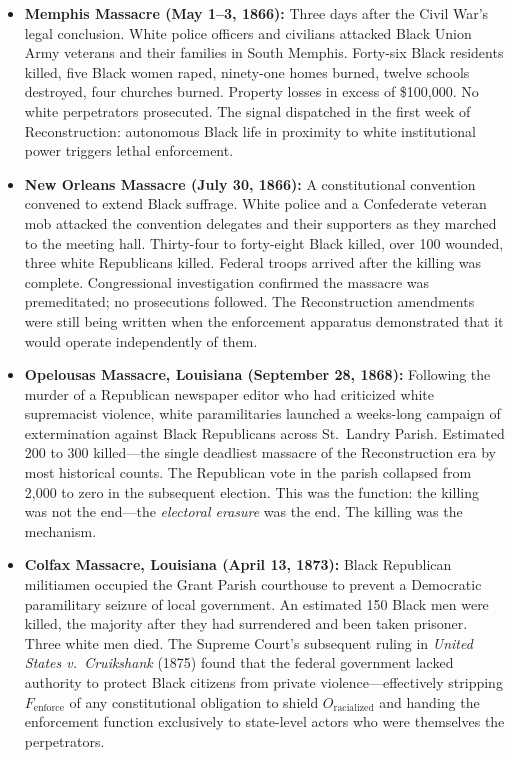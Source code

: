 \begin{itemize}

    \item \textbf{Memphis Massacre (May 1--3, 1866):} Three days after the Civil War's legal conclusion. White police officers and civilians attacked Black Union Army veterans and their families in South Memphis. Forty-six Black residents killed, five Black women raped, ninety-one homes burned, twelve schools destroyed, four churches burned. Property losses in excess of \$100,000. No white perpetrators prosecuted. The signal dispatched in the first week of Reconstruction: autonomous Black life in proximity to white institutional power triggers lethal enforcement.

    \item \textbf{New Orleans Massacre (July 30, 1866):} A constitutional convention convened to extend Black suffrage. White police and a Confederate veteran mob attacked the convention delegates and their supporters as they marched to the meeting hall. Thirty-four to forty-eight Black killed, over 100 wounded, three white Republicans killed. Federal troops arrived after the killing was complete. Congressional investigation confirmed the massacre was premeditated; no prosecutions followed. The Reconstruction amendments were still being written when the enforcement apparatus demonstrated that it would operate independently of them.

    \item \textbf{Opelousas Massacre, Louisiana (September 28, 1868):} Following the murder of a Republican newspaper editor who had criticized white supremacist violence, white paramilitaries launched a weeks-long campaign of extermination against Black Republicans across St.\ Landry Parish. Estimated 200 to 300 killed---the single deadliest massacre of the Reconstruction era by most historical counts. The Republican vote in the parish collapsed from 2,000 to zero in the subsequent election. This was the function: the killing was not the end---the \textit{electoral erasure} was the end. The killing was the mechanism.

    \item \textbf{Colfax Massacre, Louisiana (April 13, 1873):} Black Republican militiamen occupied the Grant Parish courthouse to prevent a Democratic paramilitary seizure of local government. An estimated 150 Black men were killed, the majority after they had surrendered and been taken prisoner. Three white men died. The Supreme Court's subsequent ruling in \textit{United States v.\ Cruikshank} (1875) found that the federal government lacked authority to protect Black citizens from private violence---effectively stripping $F_{\text{enforce}}$ of any constitutional obligation to shield $O_{\text{racialized}}$ and handing the enforcement function exclusively to state-level actors who were themselves the perpetrators.


\end{itemize}
